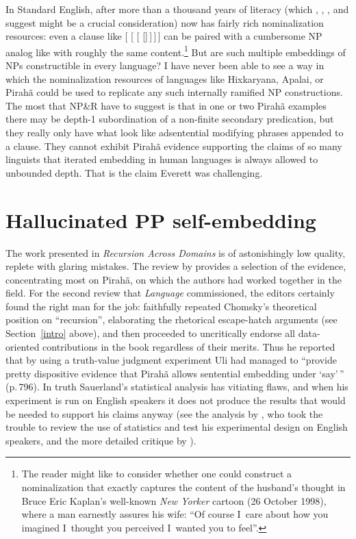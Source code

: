 \documentclass[output=paper,colorlinks,citecolor=brown
]{langscibook}
\begin{document}
In Standard English, after more than a thousand years of literacy
(which \citealt{ONeil77}, \citealt{Givon79}, \citealt{Mithun84}, and
\citealt{Kalmar85} suggest might be a crucial consideration) now has
fairly rich nominalization resources: even a clause like
 [ [
[ []\,]\,]\,] can be paired with
a cumbersome NP analog like  with roughly
the same content.\footnote{%
   The reader might like to consider whether one could construct a
   nominalization that exactly captures the content of the husband's
   thought in Bruce Eric Kaplan's well-known \textit{New Yorker}
   cartoon (26 October 1998), where a man earnestly assures his wife:
   ``Of course I~care about how you imagined I~thought you perceived
   I~wanted you to feel''.}
But are such multiple embeddings of NPs constructible in every language?
I have never been able to see a way in which the nominalization resources
of languages like Hixkaryana, Apalai, or Pirah{\~a} could be used to
replicate any such internally ramified NP constructions. The most that
NP\&R have to suggest is that in one or two Pirah{\~a} examples there
may be depth-1 subordination of a non-finite secondary predication, but
they really only have what look like adsentential modifying phrases
appended to a clause. They cannot exhibit Pirah{\~a} evidence supporting
the claims of so many linguists that iterated embedding in human
languages is always allowed to unbounded depth. That is the claim
Everett was challenging.

\section{Hallucinated PP self-embedding}\label{ppsection}

The work presented in \textit{Recursion Across Domains} \citep{AmMaNeRo18}
is of astonishingly low quality, replete with glaring mistakes. The review
by \citet{EverGibs19} provides a selection of the evidence, concentrating
most on Pirah{\~a}, on which the authors had worked together in the field.
For the second review that \textit{Language} commissioned, the editors
certainly found the right man for the job: \citet{Hornstein19} faithfully
repeated Chomsky's theoretical position on ``recursion'', elaborating
the rhetorical escape-hatch arguments (see Section~\ref{intro} above),
and then proceeded to uncritically endorse all data-oriented contributions
in the book regardless of their merits. Thus he reported that by using a
truth-value judgment experiment Uli \citet{Sauerland18} had managed to
``provide pretty dispositive evidence that Pirah{\~a} allows sentential
embedding under `say'\,'' (p.\,796). In truth Sauerland's statistical
analysis has vitiating flaws, and when his experiment is run on English
speakers it does not produce the results that would be needed to
support his claims anyway (see the analysis by
\citealt[781--784]{EverGibs19}, who took the trouble to review the use
of statistics and test his experimental design on English speakers,
and the more detailed critique by ).
\end{document}
